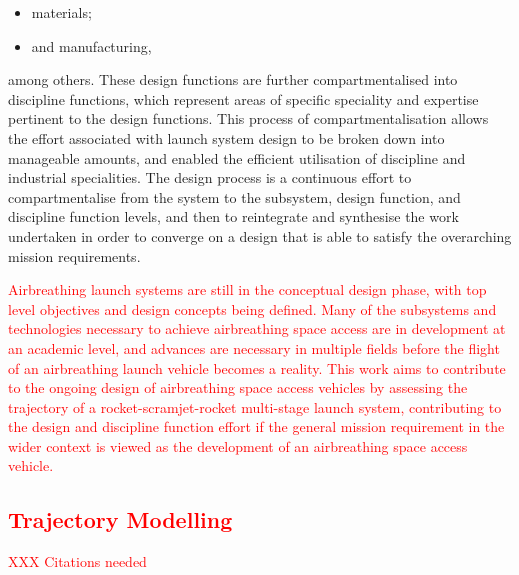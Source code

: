 {\begin{itemize}
\item materials;
\item and manufacturing,
\end{itemize}
among others\cite{Blair2001}. These design functions are further compartmentalised into discipline functions, which represent areas of specific speciality and expertise pertinent to the design functions. This process of compartmentalisation allows the effort associated with launch system design to be broken down into manageable amounts, and enabled the efficient utilisation of discipline and industrial specialities. 
The design process is a continuous effort to compartmentalise from the system to the subsystem, design function, and discipline function levels, and then to reintegrate and synthesise the work undertaken in order to converge on a design that is able to satisfy the overarching mission requirements\cite{Blair2001}.
} 

 \textcolor{red}{
 	Airbreathing launch systems are still in the conceptual design phase, with top level objectives and design concepts being defined. Many of the subsystems and technologies necessary to achieve airbreathing space access are in development at an academic level, and advances are necessary in multiple fields before the flight of an airbreathing launch vehicle becomes a reality. This work aims to contribute to the ongoing design of airbreathing space access vehicles by assessing the trajectory of a rocket-scramjet-rocket multi-stage launch system, contributing to the design and discipline function effort if the general mission requirement in the wider context is viewed as the development of an airbreathing space access vehicle.
 }



  \textcolor{red}{
  	\subsection{Trajectory Modelling}
  }

\textcolor{red}{XXX Citations needed}



